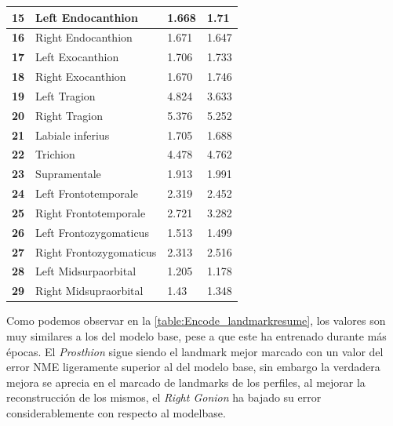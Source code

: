 \begin{table}[!ht]
\begin{tabular}{|l|l|l|l|}
                    \textbf{15} & Left Endocanthion & \cellcolor{green!25} 1.668 & 1.71 \\ \hline
                    \textbf{16} & Right Endocanthion & 1.671 & \cellcolor{green!25} 1.647 \\ \hline
                    \textbf{17} & Left Exocanthion & \cellcolor{green!25} 1.706 & 1.733 \\ \hline
                    \textbf{18} & Right Exocanthion & \cellcolor{green!25} 1.670 & 1.746 \\ \hline
                    \textbf{19} & Left Tragion & 4.824 & \cellcolor{green!25} 3.633 \\ \hline
                    \textbf{20} & Right Tragion & 5.376 & \cellcolor{green!25} 5.252 \\ \hline
                    \textbf{21} & Labiale inferius & 1.705 & \cellcolor{green!25} 1.688 \\ \hline
                    \textbf{22} & Trichion & \cellcolor{green!25} 4.478 & 4.762 \\ \hline
                    \textbf{23} & Supramentale & \cellcolor{green!25} 1.913 & 1.991 \\ \hline
                    \textbf{24} & Left Frontotemporale & \cellcolor{green!25} 2.319 & 2.452 \\ \hline
                    \textbf{25} & Right Frontotemporale & \cellcolor{green!25} 2.721 & 3.282 \\ \hline
                    \textbf{26} & Left Frontozygomaticus & 1.513 & \cellcolor{green!25} 1.499 \\ \hline
                    \textbf{27} & Right Frontozygomaticus & \cellcolor{green!25} 2.313 & 2.516 \\ \hline
                    \textbf{28} & Left Midsurpaorbital & 1.205 & \cellcolor{green!25} 1.178 \\ \hline
                    \textbf{29} & Right Midsupraorbital & 1.43 & \cellcolor{green!25} 1.348 \\ \hline
                \end{tabular}
                \label{table:Encode_landmarkresume}
            \end{table}    
    \noindent Como podemos observar en la \autoref{table:Encode_landmarkresume}, los valores son muy similares a los del modelo base, pese a que este ha entrenado durante más épocas. El \textit{Prosthion} sigue siendo el landmark mejor marcado con un valor del error NME ligeramente superior al del modelo base, sin embargo la verdadera mejora se aprecia en el marcado de landmarks de los perfiles, al mejorar la reconstrucción de los mismos, el \textit{Right Gonion} ha bajado su error considerablemente con respecto al modelbase.
    
